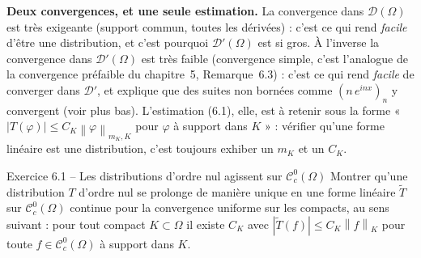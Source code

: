 \documentclass[11pt,a4paper]{article}
\newcommand{\norm}[1]{\left\|#1\right\|}
\newcommand{\Cc}{\mathcal{C}^0_c}
\newcommand{\D}{\mathcal{D}}
\theoremstyle{definition}
\begin{document}
\begin{pointcle}
\textbf{Deux convergences, et une seule estimation.} La convergence dans $\D(\Omega)$ est très exigeante (support commun, toutes les dérivées) : c'est ce qui rend \emph{facile} d'être une distribution, et c'est pourquoi $\D'(\Omega)$ est si gros. À l'inverse la convergence dans $\D'(\Omega)$ est très faible (convergence simple, c'est l'analogue de la convergence préfaible du chapitre~5, Remarque~6.3) : c'est ce qui rend \emph{facile} de converger dans $\D'$, et explique que des suites non bornées comme $(n\,e^{inx})_n$ y convergent (voir plus bas). L'estimation (6.1), elle, est à retenir sous la forme « $|T(\varphi)|\le C_K\norm\varphi_{m_K,K}$ pour $\varphi$ à support dans $K$ » : vérifier qu'une forme linéaire est une distribution, c'est toujours exhiber un $m_K$ et un $C_K$.
\end{pointcle}

\begin{exo}{Exercice 6.1 -- Les distributions d'ordre nul agissent sur $\Cc(\Omega)$}
Montrer qu'une distribution $T$ d'ordre nul se prolonge de manière unique en une forme linéaire $\tilde T$ sur $\Cc(\Omega)$ continue pour la convergence uniforme sur les compacts, au sens suivant : pour tout compact $K\subset\Omega$ il existe $C_K$ avec $|\tilde T(f)|\le C_K\norm f_K$ pour toute $f\in\Cc(\Omega)$ à support dans $K$.
\end{exo}
\end{document}
